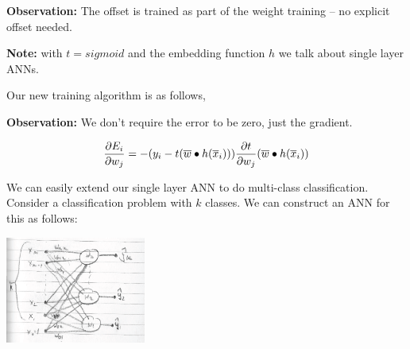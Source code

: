 \documentclass[a4paper,blends,pdf,colorBG,slideColor]{prosper}
\begin{document}
\es


{\bf Observation:} The offset is trained as part of the weight training -- no explicit offset needed.

\vspace{.2in}

{\bf Note:} with $t= sigmoid$ and the embedding function $h$ we talk about single layer ANNs.
\es

 Our new training algorithm is as follows,
\begin{center}
\end{center}
{\bf Observation:} We don't require the error to be zero, just the gradient.

\vspace{.2in}

\[
\frac{\partial E_i}{\partial w_j} =  - (y_i - t(\overline{w}\bullet h(\overline{x}_i)))\frac{\partial t}{\partial w_j} (\overline{w}\bullet h(\overline{x}_i))
\]
\es



We can easily extend our single layer ANN to do multi-class classification.  Consider a classification
problem with $k$ classes.  We can construct an ANN for this as follows:

\begin{center}
\includegraphics[height=35mm]{images/k-class-perceptron.eps}
\end{center}
\end{document}
